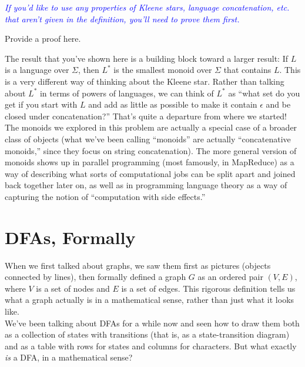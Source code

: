 \documentclass{article}
\renewcommand{\(}{\left(}
\renewcommand{\)}{\right)}
\theoremstyle{plain}
\theoremstyle{plain}
\theoremstyle{definition}
\newcommand{\annotate}[1]{\textit{\textcolor{blue}{#1}}}
\begin{document}
\annotate{If you'd like to use any properties of Kleene stars, language concatenation, etc. that aren't given in the definition, you'll need to prove them first.} \\

\begin{shaded}
Provide a proof here. 
\end{shaded}

The result that you've shown here is a building block toward a larger result: If $L$ is a language over $\Sigma$, then $L^*$ is the smallest monoid over $\Sigma$ that contains $L$.
This is a very different way of thinking about the Kleene star. Rather than talking about $L^*$ in terms of powers of languages, we can think of $L^*$ as ``what set do you get if you start with $L$ and add as little as possible to make it contain $\epsilon$ and be closed under concatenation?'' That's quite a departure from where we started! \\

The monoids we explored in this problem are actually a special case of a broader class of objects (what we've been calling ``monoids'' are actually ``concatenative monoids,'' since they focus on string concatenation). The more general version of monoids shows up in parallel programming (most famously, in MapReduce) as a way of describing what sorts of computational jobs can be split apart and joined back together later on, as well as in programming language theory as a way of capturing the notion of ``computation with side effects.'' 

\newpage


\section{DFAs, Formally}
When we first talked about graphs, we saw them first as pictures (objects connected by lines), then formally defined a graph $G$ as an ordered pair $(V, E)$, where $V$ is a set of nodes and $E$ is a set of edges. This rigorous definition tells us what a graph actually is in a mathematical sense, rather than just what it looks like. \\

We've been talking about DFAs for a while now and seen how to draw them both as a collection of states with transitions (that is, as a state-transition diagram) and as a table with rows for states and columns for characters. But what exactly \textit{is} a DFA, in a mathematical sense? \\
\end{document}
